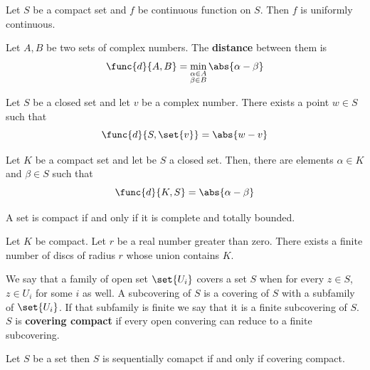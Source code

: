 \begin{theorem}
      Let \(S\) be a compact set and \(f\) be continuous function on \(S\). Then  \(f\) is uniformly continuous.
\end{theorem}


\begin{definition}
      Let \(A,B\) be two sets of complex numbers. The \textbf{distance} between them is 
      \begin{equation*}
            \func{d}{A,B} = \min_{\substack{\alpha \in A \\ \beta \in B}} \abs{\alpha - \beta}
      \end{equation*}
\end{definition}

\begin{theorem}
      Let \(S\) be a closed set and let \(v\) be a complex number. There exists a point \(w \in S\) such that 
      \begin{equation*}
            \func{d}{S,\set{v}} = \abs{w - v}
      \end{equation*}
\end{theorem}

\begin{theorem}
      Let \(K\) be a compact set and let be \(S\) a closed set. Then, there are elements \(\alpha \in K\) and \(\beta \in S\) such that 
      \begin{equation*}
            \func{d}{K,S} = \abs{\alpha - \beta}
      \end{equation*}
\end{theorem}

\begin{theorem}
      A set is compact if and only if it is complete and totally bounded.
\end{theorem}

\begin{corollary}
      Let \(K\) be compact. Let \(r\) be a real number greater than zero. There exists a finite number of discs of radius \(r\) whose union contains \(K\).
\end{corollary}

We say that a family of open set \(\set{U_i}\) covers a set \(S\) when for every \(z \in S\), \(z \in U_i\) for some \(i\) as well. A subcovering of \(S\) is a covering of \(S\) with a subfamily of \(\set{U_i}\). If that subfamily is finite we say that it is a finite subcovering of \(S\). \(S\) is \textbf{covering compact} if every open convering can reduce to a finite subcovering.

\begin{theorem}
      Let \(S\) be a set then \(S\) is sequentially comapct if and only if covering compact.
\end{theorem}
